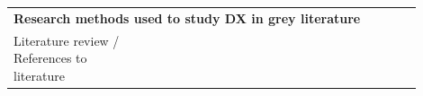 \documentclass[english, 12pt, a4paper, sci, utf8, a-1b, online]{aaltothesis}
\begin{document}
{\begin{center}
\begin{longtable}{p{0.3\linewidth}p{0.6\linewidth}}
      \multicolumn{2}{l}{\textbf{Research methods used to study DX in grey literature}}                                                                                                                                                                                                                                                                                                                                                                                                                                                                                                                                                                                                                                                                                                                                                                                                                                                                                                                 \\*
      Literature review / References to literature & \textcite{what-is-api-developer-experience-and-why-it-matters} \newline \textcite{what-exactly-is-developer-experience}                                                                                                                                                                                                                                                                                                                                                                                                                                                                                                                                                                                                                                                                                                                                                                                                                            \\

\end{longtable}
\end{center}}
\end{document}
